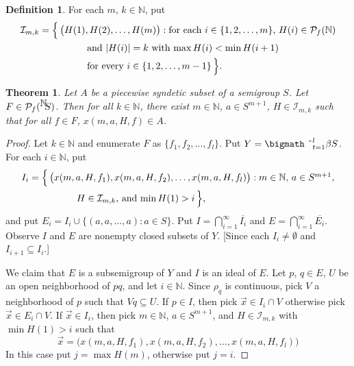 \documentclass[12pt]{letter}
\theoremstyle{plain}
\newtheorem*{thm}{Theorem}
\theoremstyle{definition}
\newtheorem*{defn}{Definition}
\newcommand{\bbN}{\mathbb{N}}
\newcommand{\calI}{\mathcal{I}}
\newcommand{\Pf}{\mathcal{P}_f}
\newcommand{\setfunc}[2]{\hbox{${}^{\hbox{$#1$}}\hskip -3 pt #2$}}
\newcommand{\bigtimes}{\hbox{\bigmath \char'2}}
\begin{document}
\begin{letter}{}
\begin{defn}
  For each $m$, $k \in \bbN$, put
  \begin{align*}
    \calI_{m,k} &= \Bigl\{\, \bigl(H(1), H(2), \ldots, H(m)\bigr) :
    \mbox{for each $i \in \{1, 2, \ldots, m\}$, $H(i) \in \Pf(\bbN)$}
    \\
    &\hspace{5em}\mbox{and $|H(i)| = k$ with $\max H(i) < \min
      H(i+1)$}\\
    &\hspace{5em}\mbox{for every $i \in \{1, 2, \ldots, m-1\}$} \,\Bigr\}.
  \end{align*}
\end{defn}

\begin{thm}
  Let $A$ be a piecewise syndetic subset of a semigroup $S$. 
  Let $F \in \Pf(\setfunc{\bbN}{S})$.
  Then for all $k \in \bbN$, there exist $m \in \bbN$, $a \in
  S^{m+1}$, $H \in \calI_{m,k}$ such that for all $f \in F$, $x(m, a,
  H, f) \in A$.
\end{thm}
\begin{proof}
  Let $k \in \bbN$ and enumerate $F$ as $\{f_1, f_2, \ldots, f_l \}$.
  Put $Y = \bigtimes_{t=1}^l \beta S$.
  For each $i \in \bbN$, put
  \begin{align*}
    I_i &= \Bigl\{\, \bigl( x(m, a, H, f_1), x(m, a, H, f_2), \ldots,
    x(m, a, H, f_l) \bigr) : \mbox{$m \in \bbN$, $a \in S^{m+1}$,} \\
    &\hspace{5em} \mbox{$H \in \calI_{m,k}$, and $\min H(1) > i$}
    \,\Bigr\},
  \end{align*}
  and put $E_i = I_i \cup \{(a, a, \ldots, a) : a \in S\}$.
  Put $I = \bigcap_{i=1}^\infty \overline{I_i}$ and $E =
  \bigcap_{i=1}^\infty \overline{E_i}$.
  Observe $I$ and $E$ are nonempty closed subsets of $Y$.
  [Since each $I_i \ne \emptyset$ and $I_{i+1} \subseteq I_i$.]
  
  We claim that $E$ is a subsemigroup of $Y$ and $I$ is an ideal of
  $E$. 
  Let $p$, $q \in E$, $U$ be an open neighborhood of $pq$, and let $i
  \in \bbN$. 
  Since $\rho_q$ is continuous, pick $V$ a neighborhood of $p$ such
  that $Vq \subseteq U$. 
  If $p \in I$, then pick $\vec{x} \in I_i \cap V$ otherwise pick
  $\vec{x} \in E_i \cap V$.
  If $\vec{x} \in I_i$, then pick $m \in \bbN$, $a \in S^{m+1}$, and
  $H \in \calI_{m,k}$ with $\min H(1) > i$ such that
  \[
    \vec{x} = \bigl( x(m, a, H, f_1), x(m, a, H, f_2), \ldots, x(m,
    a, H, f_l) \bigr)
  \]
  In this case put $j = \max H(m)$, otherwise put $j=i$. 


\end{proof}
\end{letter}
\end{document}
